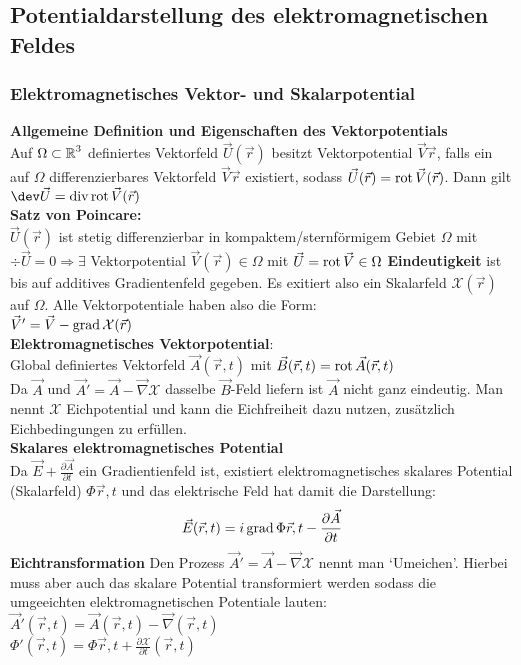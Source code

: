 \documentclass[english]{latex4ei/latex4ei_sheet}
\begin{document}
\subsection{Potentialdarstellung des elektromagnetischen Feldes}
\subsubsection{Elektromagnetisches Vektor- und Skalarpotential}
\textbf{Allgemeine Definition und Eigenschaften des Vektorpotentials}\\
Auf $\Omega \subset \operatorname{\mathbb R}^3$ definiertes Vektorfeld $\vec{U}(\vec{r})$ besitzt Vektorpotential $\vec{V}\vec{r}$, falls ein auf $\Omega$ differenzierbares Vektorfeld $\vec{V}\vec{r}$ existiert, sodass $\vec{U}(\vec{r})=\operatorname{rot} \vec{V}(\vec{r})$. Dann gilt $\dev \vec{U}=\div{\rot{\vec{V}(\vec{r})}}$\\
\textbf{Satz von Poincare:}\\
$\vec{U}(\vec{r})$ ist stetig differenzierbar in kompaktem/sternf\"ormigem Gebiet $\Omega$ mit $\div \vec{U}=0 \Rightarrow \exists $ Vektorpotential $\vec{V}(\vec{r}) \in \Omega$ mit $\vec{U}=\operatorname{rot}{\vec{V}} \in \Omega$
\textbf{Eindeutigkeit} ist bis auf additives Gradientenfeld gegeben. Es exitiert also ein Skalarfeld $\mathcal{X}(\vec{r})$ auf $\Omega$. Alle Vektorpotentiale haben also die Form:\\
$\vec{V}'=\vec{V}-\operatorname{grad}{\mathcal{X}(\vec{r})}$\\
\textbf{Elektromagnetisches Vektorpotential}:\\
Global definiertes Vektorfeld $\vec{A}(\vec{r},t)$ mit $\vec{B}(\vec{r},t)=\operatorname{rot}{\vec{A}(\vec{r},t)}$\\
Da $\vec{A}$ und $\vec{A}'=\vec{A}-\vec{\nabla}\mathcal{X}$ dasselbe $\vec{B}$-Feld liefern ist $\vec{A}$ nicht ganz eindeutig. Man nennt $\mathcal{X}$ Eichpotential und kann die Eichfreiheit dazu nutzen, zus\"atzlich Eichbedingungen zu erf\"ullen.\\
\textbf{Skalares elektromagnetisches Potential}\\
Da $\vec{E}+\frac{\partial \vec{A}}{\partial t}$ ein Gradientienfeld ist, existiert elektromagnetisches skalares Potential (Skalarfeld) $\Phi{\vec{r},t}$ und das elektrische Feld hat damit die Darstellung:
\[\vec{E}(\vec{r},t)=i\operatorname{grad}{\Phi{\vec{r},t}}-\frac{\partial \vec{A}}{\partial t}\]
\textbf{Eichtransformation}
Den Prozess $\vec{A}'=\vec{A}-\vec{\nabla}\mathcal{X}$ nennt man `Umeichen'. Hierbei muss aber auch das skalare Potential transformiert werden sodass die umgeeichten elektromagnetischen Potentiale lauten:\\
$\vec{A}'(\vec{r},t)=\vec{A}(\vec{r},t)-\vec{\nabla}(\vec{r},t)$\\
$\Phi'(\vec{r},t)=\Phi{\vec{r},t}+\frac{\partial \mathcal{X}}{\partial t}(\vec{r},t)$\\
\end{document}
